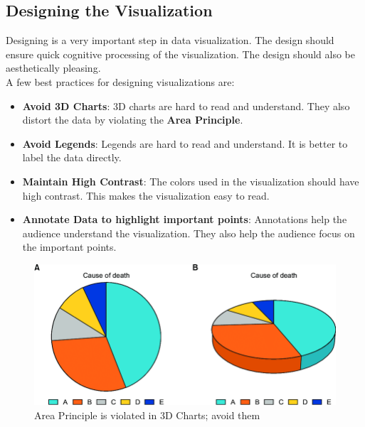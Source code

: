\documentclass[11pt,fleqn]{book} %
\begin{document}
\begin{example}
\subsection{Designing the Visualization}

Designing is a very important step in data visualization.
The design should ensure quick cognitive processing of the visualization.
The design should also be aesthetically pleasing.\\

A few best practices for designing visualizations are:

\begin{itemize}
  \item \textbf{Avoid 3D Charts}:
    3D charts are hard to read and understand.
    They also distort the data by violating the
    \textbf{Area Principle}.
  \item \textbf{Avoid Legends}:
    Legends are hard to read and understand.
    It is better to label the data directly.
  \item \textbf{Maintain High Contrast}:
    The colors used in the visualization should have
    high contrast. This makes the visualization easy to read.
  \item \textbf{Annotate Data to highlight important points}:
    Annotations help the audience understand the visualization.
    They also help the audience focus on the important points.
\end{itemize}

\begin{figure}[hibt!]
  \centering
  \includegraphics[width=0.8\linewidth]{Pictures/area-principle.png}
  \caption{Area Principle is violated in 3D Charts; avoid them}
  \label{fig:area-principle}
\end{figure}


\end{example}
\end{document}

